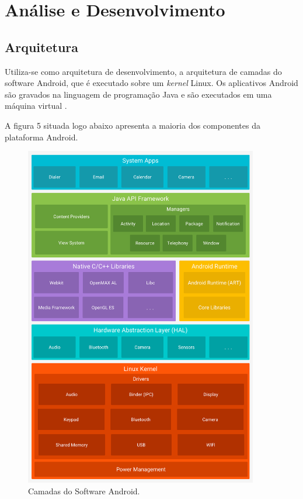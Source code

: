 \section{An\'alise e Desenvolvimento}

\subsection{Arquitetura}
Utiliza-se como arquitetura de desenvolvimento, a arquitetura de camadas do software Android, que \'e executado sobre um \textit{kernel} Linux. Os aplicativos Android s\~ao gravados na linguagem de programa\c{c}\~ao Java e s\~ao executados em uma  {m\'aquina virtual} \cite{Ableson2009}.

A figura 5 situada logo abaixo apresenta a maioria dos componentes da plataforma Android. 
\begin{figure}[H]
	\centering
	\caption[Camadas do Software Android]{Camadas do Software Android. \label{fig:figurearquitetura}}
	\includegraphics[height=15cm]{./Figuras/arquitetura_figure.png}%
\end{figure}


